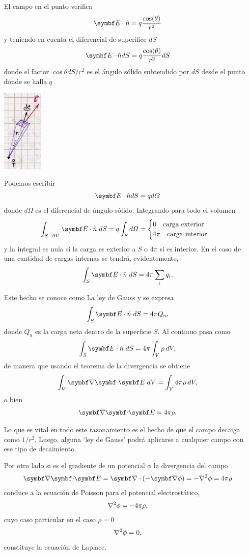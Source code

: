 \documentclass[10pt,oneside]{CBFT_book}
\begin{document}
El campo en el punto verifica
\[
	\vb{E} \cdot \hat{n} = q \frac{\cos(\theta)}{r^2}
\]
y teniendo en cuenta el diferencial de superifice $dS$
\[
	\vb{E} \cdot \hat{n} dS = q \frac{\cos(\theta)}{r^2} dS
\]
donde el factor $ \cos\theta dS / r^2 $ es el ángulo sólido subtendido por $dS$ desde el punto donde se halla $q$

\includegraphics[width=0.15\textwidth]{images/fig_ft1_gauss_solid_angle.jpg}

Podemos escribir 
\[
	\vb{E} \cdot \hat{n} dS = q d\Omega
\]
donde $ d\Omega $ es el diferencial de ángulo sólido. Integrando para todo el volumen
\[
	\int_{S\equiv\partial V} \vb{E} \cdot \hat{n} \; dS = q \int_S d\Omega =
	\begin{cases}
	 0 \quad \textrm{carga exterior}\\
	 4\pi \quad \textrm{carga interior}
	\end{cases}
\]
y la integral es nula si la carga es exterior a $S$ o $4\pi$ si es interior.
En el caso de una cantidad de cargas internas se tendrá, evidentemente,
\[
	\int_S \vb{E} \cdot \hat{n} \; dS = 4\pi \sum_i q_i.
\]

Este hecho se conoce como La ley de Gauss y se expresa 
\[
	\int_S \vb{E} \cdot \hat{n} \; dS = 4\pi Q_n,
\]
donde $Q_n$ es la carga neta dentro de la superficie $S$. Al continuo pasa como 
\[
	\int_S \vb{E} \cdot \hat{n} \; dS = 4\pi \int_V \rho \: dV,
\]
de manera que usando el teorema de la divergencia se obtiene 
\[
	\int_V \divem{E} \; dV = \int_V 4\pi \rho \: dV,
\]
o bien
\[
	\divem{E} = 4\pi \rho.
\]

Lo que es vital en todo este razonamiento es el hecho de que el campo decaiga como $1/r^2$.
Luego, alguna `ley de Gauss' podrá aplicarse a cualquier campo con ese tipo de decaimiento.

Por otro lado si  es el gradiente de un potencial $\phi$ la divergencia del campo
\[
	\divem{E} = \Nabla\cdot{(-\Nabla\phi)} = - \lapm\phi = 4\pi \rho
\]
conduce a la ecuación de Poisson para el potencial electrostático,
\[
	\nabla^2{\phi} = -4\pi \rho,
\]
cuyo caso particular en el caso $\rho=0$
\[
	\nabla^2{\phi} = 0,
\]
constituye la ecuación de Laplace.
\end{document}
